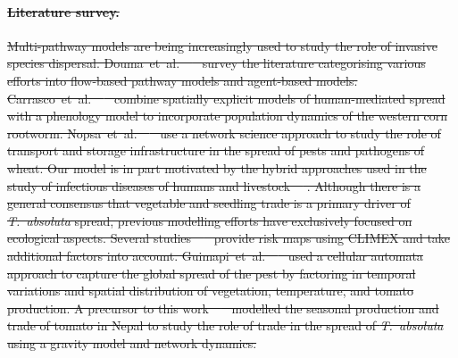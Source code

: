 \documentclass[11pt]{article}
\newcommand{\tuta}{\emph{T.~absoluta}}
\theoremstyle{definition}
\providecommand{\DIFdeltex}[1]{{\protect\color{red}\sout{#1}}}                      %
\providecommand{\DIFaddend}{} %
\providecommand{\DIFdelbegin}{} %
\providecommand{\DIFdelend}{} %
\providecommand{\DIFdel}[1]{\texorpdfstring{\DIFdeltex{#1}}{}} %
\newcommand{\DIFscaledelfig}{0.5}
\newlength{\DIFdelgraphicswidth} %
\newlength{\DIFdelgraphicsheight} %
\newcommand{\DIFdelincludegraphics}[2][]{%
\sbox{\DIFdelgraphicsbox}{\DIFOincludegraphics[#1]{#2}}%
\settoboxwidth{\DIFdelgraphicswidth}{\DIFdelgraphicsbox} %
\settoboxtotalheight{\DIFdelgraphicsheight}{\DIFdelgraphicsbox} %
\scalebox{\DIFscaledelfig}{%
\parbox[b]{\DIFdelgraphicswidth}{\usebox{\DIFdelgraphicsbox}\\[-\baselineskip] \rule{\DIFdelgraphicswidth}{0em}}\llap{\resizebox{\DIFdelgraphicswidth}{\DIFdelgraphicsheight}{%
\setlength{\unitlength}{\DIFdelgraphicswidth}%
\begin{picture}(1,1)%
\thicklines\linethickness{2pt} %
{\color[rgb]{1,0,0}\put(0,0){\framebox(1,1){}}}%
{\color[rgb]{1,0,0}\put(0,0){\line( 1,1){1}}}%
{\color[rgb]{1,0,0}\put(0,1){\line(1,-1){1}}}%
\end{picture}%
}\hspace*{3pt}}} %
} %
\DeclareRobustCommand{\DIFaddend}{\DIFOaddend \let\includegraphics\DIFOincludegraphics} %
\DeclareRobustCommand{\DIFdelbegin}{\DIFOdelbegin \let\includegraphics\DIFdelincludegraphics} %
\DeclareRobustCommand{\DIFdelend}{\DIFOaddend \let\includegraphics\DIFOincludegraphics} %
\begin{document}
\DIFaddend %
\DIFdelbegin \paragraph{\DIFdel{Literature survey.}} %
\addtocounter{paragraph}{-1}%
\DIFdel{Multi-pathway models are being increasingly
used to study the role of invasive species dispersal.
Douma~et~al.~\mbox{%
\cite{douma2016pathway} }\hspace{0pt}%
survey the literature categorising
various efforts into flow-based pathway models and agent-based models.
Carrasco~et~al.~\mbox{%
\cite{carrasco2010unveiling} }\hspace{0pt}%
combine spatially
explicit models of human-mediated spread with a phenology model to
incorporate population dynamics of the western corn rootworm.
Nopsa~et~al.~\mbox{%
\cite{nopsa2015ecological} }\hspace{0pt}%
use a network science approach to
study the role of transport and storage infrastructure in the spread of
pests and pathogens of wheat.  Our model is in part motivated by the hybrid
approaches used in the study of infectious diseases of humans and
livestock~\mbox{%
\cite{bradhurst2015hybrid,yang2016}}\hspace{0pt}%
.
Although there is a general consensus that vegetable and seedling trade is
a primary driver of \tuta{} spread, previous modelling efforts have
exclusively focused on ecological aspects. Several
studies~\mbox{%
\cite{desneux2010biological,tonnang2015identification} }\hspace{0pt}%
provide risk
maps using CLIMEX and take additional factors into account.
Guimapi~et~al.~\mbox{%
\cite{guimapi2016modeling} }\hspace{0pt}%
used a cellular automata approach
to capture the global spread of the pest by factoring in
temporal
variations and spatial distribution of vegetation, temperature, and tomato
production.
A precursor to this work~\mbox{%
\cite{venkatramanan2019modeling}
}\hspace{0pt}%
modelled the seasonal production and trade of tomato in Nepal to study the
role of trade in the spread of \tuta{} using a gravity model and
network dynamics.
}\DIFdelend 
\end{document}
